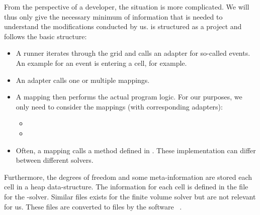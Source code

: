From the perspective of a developer, the situation is more complicated.
We will thus only give the necessary minimum of information that is needed to understand the modifications conducted by us.
\exahype{} is structured as a \peano{} project and follows the basic structure:
\begin{itemize}
\item A runner iterates through the grid and calls an adapter for so-called events.
  An example for an event is entering a cell, for example.
\item An adapter calls one or multiple mappings.
\item A mapping then performs the actual program logic.
  For our purposes, we only need to consider the mappings (with corresponding adapters):
  \begin{itemize}
  \item {}
  \item {}
  \end{itemize}
\item Often, a mapping calls a method defined in .
  These implementation can differ between different solvers.
\end{itemize}
Furthermore, the degrees of freedom and some meta-information are stored each cell in a heap data-structure.
The information for each cell is defined in the file  for the \dg{}-solver.
Similar files exists for the finite volume solver but are not relevant for us.
These files are converted to \cpp{} files by the software ~\cite{bungartz2008dastgen}.

